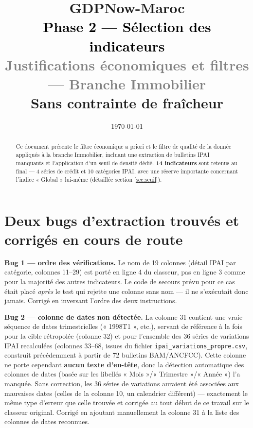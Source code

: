 \documentclass[11pt,a4paper]{article}
\title{\vspace{-1.3cm}\textcolor{bleuprincip}{\Huge\bfseries GDPNow-Maroc}\\[0.3cm]
\textcolor{black}{\Large Phase 2 --- Sélection des indicateurs}\\[0.15cm]
\textcolor{gray}{\large Justifications économiques et filtres --- Branche Immobilier}\\[0.1cm]
\textcolor{orangealerte}{\normalsize Sans contrainte de fraîcheur}}
\author{}
\date{\today}
\begin{document}
\maketitle
\thispagestyle{empty}

\begin{abstract}
\noindent Ce document présente le filtre économique a priori et le filtre de qualité de la donnée appliqués à la branche Immobilier, incluant une extraction de bulletins IPAI manquants et l'application d'un seuil de densité dédié. \textbf{14 indicateurs} sont retenus au final --- 4 séries de crédit et 10 catégories IPAI, avec une réserve importante concernant l'indice « Global » lui-même (détaillée section \ref{sec:seuil}).
\end{abstract}

\tableofcontents
\vspace{0.3cm}

\section{Deux bugs d'extraction trouvés et corrigés en cours de route}

\begin{alertebox}
\textbf{Bug 1 --- ordre des vérifications.} Le nom de 19 colonnes (détail IPAI par catégorie, colonnes 11--29) est porté en ligne 4 du classeur, pas en ligne 3 comme pour la majorité des autres indicateurs. Le code de secours prévu pour ce cas était placé \emph{après} le test qui rejette une colonne sans nom --- il ne s'exécutait donc jamais. Corrigé en inversant l'ordre des deux instructions.

\textbf{Bug 2 --- colonne de dates non détectée.} La colonne 31 contient une vraie séquence de dates trimestrielles (« 1998T1 », etc.), servant de référence à la fois pour la cible rétropolée (colonne 32) et pour l'ensemble des 36 séries de variations IPAI recalculées (colonnes 33--68, issues du fichier \texttt{ipai\_variations\_propre.csv}, construit précédemment à partir de 72 bulletins BAM/ANCFCC). Cette colonne ne porte cependant \textbf{aucun texte d'en-tête}, donc la détection automatique des colonnes de dates (basée sur les libellés « Mois »/« Trimestre »/« Année ») l'a manquée. Sans correction, les 36 séries de variations auraient été associées aux mauvaises dates (celles de la colonne 10, un calendrier différent) --- exactement le même type d'erreur que celle trouvée et corrigée au tout début de ce travail sur le classeur original. Corrigé en ajoutant manuellement la colonne 31 à la liste des colonnes de dates reconnues.
\end{alertebox}
\end{document}
